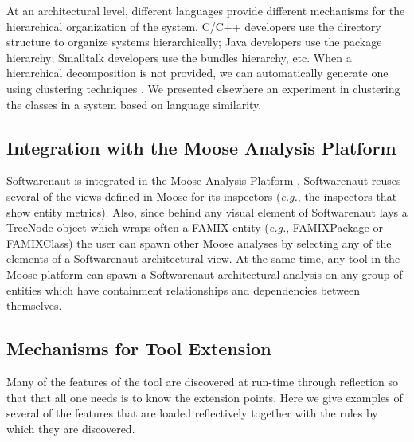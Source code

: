\documentclass[preprint,12pt]{elsarticle}
\newcommand{\eg}{\emph{e.g.},\xspace}
\begin{document}
At an architectural level, different languages provide different mechanisms for the hierarchical organization of the system. C/C++ developers use the directory structure to organize systems hierarchically; Java developers use the package hierarchy; Smalltalk developers use the bundles hierarchy, etc. 
When a hierarchical decomposition is not provided, we can automatically generate one using clustering techniques \cite{koschke-thesis}. We presented elsewhere an experiment in clustering the classes in a system based on language similarity\cite{Lung05a}.

\subsection {Integration with the Moose Analysis Platform}


Softwarenaut is integrated in the Moose Analysis Platform \cite{nier-story}. Softwarenaut reuses several of the views defined in Moose for its inspectors (\eg the inspectors that show entity metrics). Also, since behind any visual element of Softwarenaut lays a TreeNode object which wraps often a FAMIX entity (\eg FAMIXPackage or FAMIXClass) the user can spawn other Moose analyses by selecting any of the elements of a Softwarenaut architectural view. At the same time, any tool in the Moose platform can spawn a Softwarenaut architectural analysis on any group of entities which have containment relationships and dependencies between themselves.

\subsection {Mechanisms for Tool Extension}
\label{sec:extensible}
Many of the features of the tool are discovered at run-time through {reflection} so that that all one needs is to know the extension points. Here we give examples of several of the features that are loaded {reflectively} together with the rules by which they are discovered.
\end{document}
